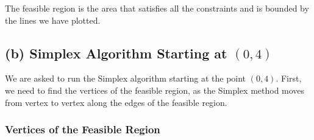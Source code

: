 \documentclass[11pt]{article}
\begin{document}
\begin{center}
\end{center}

The feasible region is the area that satisfies all the constraints and is bounded by the lines we have plotted.

\subsection*{(b) Simplex Algorithm Starting at \( (0,4) \)}

We are asked to run the Simplex algorithm starting at the point \( (0,4) \). First, we need to find the vertices of the feasible region, as the Simplex method moves from vertex to vertex along the edges of the feasible region.

\subsubsection*{Vertices of the Feasible Region}
\end{document}
